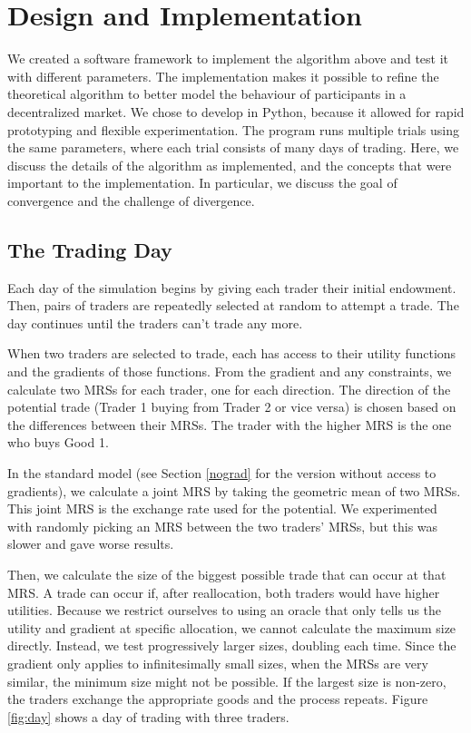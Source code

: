 \documentclass[12pt,a4paper,titlepage]{article}
\begin{document}
\section{Design and Implementation}\label{desimp}
We created a software framework to implement the algorithm above and test it with different parameters.
The implementation makes it possible to refine the theoretical algorithm to better model the behaviour of participants in a decentralized market.
We chose to develop in Python, because it allowed for rapid prototyping and flexible experimentation.
The program runs multiple trials using the same parameters, where each trial consists of many days of trading.
Here, we discuss the details of the algorithm as implemented, and the concepts that were important to the implementation.
In particular, we discuss the goal of convergence and the challenge of divergence.

\subsection{The Trading Day}

Each day of the simulation begins by giving each trader their initial endowment.
Then, pairs of traders are repeatedly selected at random to attempt a trade.
The day continues until the traders can't trade any more.

When two traders are selected to trade, each has access to their utility functions and the gradients of those functions.
From the gradient and any constraints, we calculate two MRSs for each trader, one for each direction.
The direction of the potential trade (Trader 1 buying from Trader 2 or vice versa) is chosen based on the differences between their MRSs.
The trader with the higher MRS is the one who buys Good 1.

In the standard model (see Section \ref{nograd} for the version without access to gradients), we calculate a joint MRS by taking the geometric mean of two MRSs.
This joint MRS is the exchange rate used for the potential.
We experimented with randomly picking an MRS between the two traders' MRSs, but this was slower and gave worse results.

Then, we calculate the size of the biggest possible trade that can occur at that MRS.
A trade can occur if, after reallocation, both traders would have higher utilities.
Because we restrict ourselves to using an oracle that only tells us the utility and gradient at specific allocation, we cannot calculate the maximum size directly.
Instead, we test progressively larger sizes, doubling each time.
Since the gradient only applies to infinitesimally small sizes, when the MRSs are very similar, the minimum size might not be possible.
If the largest size is non-zero, the traders exchange the appropriate goods and the process repeats.
Figure \ref{fig:day} shows a day of trading with three traders.
\end{document}
